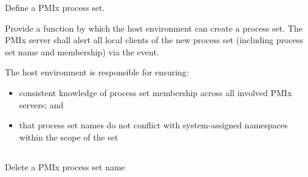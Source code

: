 \summary

Define a \ac{PMIx} process set.

\format


\begin{arglist}
\end{arglist}

\returnsimple


\descr

Provide a function by which the host environment can create a process set. The
\ac{PMIx} server shall alert all local clients of the new process set
(including process set name and membership) via the
 event.

\advicermstart
The host environment is responsible for ensuring:

\begin{itemize}
    \item consistent knowledge of process set membership across all involved
    \ac{PMIx} servers; and
    \item that process set names do not conflict with system-assigned
    namespaces within the scope of the set
\end{itemize}

\advicermend

\subsection{}

\summary

Delete a \ac{PMIx} process set name

\format

